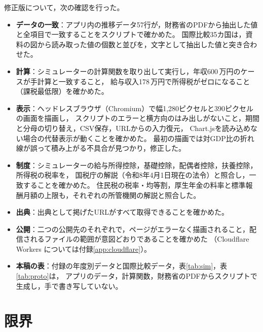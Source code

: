 \documentclass[paper=a4,fontsize=10pt]{jlreq}
\newcommand{\man}{\,万円}
\begin{document}
修正版について，次の確認を行った。
\begin{itemize}
  \item \textbf{データの一致}：アプリ内の推移データ57行が，財務省のPDFから抽出した値と全項目で一致することをスクリプトで確かめた。
    国際比較35カ国は，資料の図から読み取った値の個数と並びを，文字として抽出した値と突き合わせた。
  \item \textbf{計算}：シミュレーターの計算関数を取り出して実行し，年収600\man のケースが手計算と一致すること，
    給与収入178\man で所得税がゼロになること（課税最低限）を確かめた。
  \item \textbf{表示}：ヘッドレスブラウザ（Chromium）で幅1,280ピクセルと390ピクセルの画面を描画し，
    スクリプトのエラーと横方向のはみ出しがないこと，期間と分母の切り替え，CSV保存，URLからの入力復元，
    Chart.jsを読み込めない場合の代替表示が動くことを確かめた。
    最初の描画では対GDP比の折れ線が誤って積み上がる不具合が見つかり，修正した。
  \item \textbf{制度}：シミュレーターの給与所得控除，基礎控除，配偶者控除，扶養控除，所得税の税率を，
    国税庁の解説（令和8年4月1日現在の法令）\cite{nta}と照合し，一致することを確かめた。
    住民税の税率・均等割，厚生年金の料率と標準報酬月額の上限も，それぞれの所管機関の解説\cite{soumu,nenkin}と照合した。
  \item \textbf{出典}：出典として掲げたURLがすべて取得できることを確かめた。
  \item \textbf{公開}：二つの公開先のそれぞれで，ページがエラーなく描画されること，配信されるファイルの範囲が意図どおりであることを確かめた
    （Cloudflare Workers については付録\ref{app:cloudflare}）。
  \item \textbf{本稿の表}：付録の年度別データと国際比較データ，表\ref{tab:sim}，表\ref{tab:proto}は，
    アプリのデータ，計算関数，財務省のPDFからスクリプトで生成し，手で書き写していない。
\end{itemize}

\section{限界}\label{sec:limits}
\end{document}
